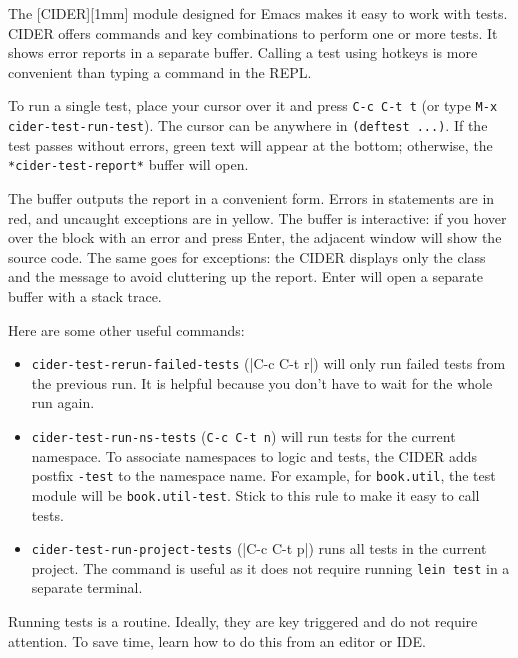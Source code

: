 
The [CIDER][1mm] module designed for Emacs makes it easy to work with tests. CIDER offers commands and key combinations to perform one or more tests. It shows error reports in a separate buffer. Calling a test using hotkeys is more convenient than typing a command in the REPL.

To run a single test, place your cursor over it and press \verb|C-c C-t t| (or type \verb|M-x cider-test-run-test|). The cursor can be anywhere in \verb|(deftest ...)|. If the test passes without errors, green text will appear at the bottom; otherwise, the \verb|*cider-test-report*| buffer will open.

The buffer outputs the report in a convenient form. Errors in statements are in red, and uncaught exceptions are in yellow. The buffer is interactive: if you hover over the block with an error and press Enter, the adjacent window will show the source code. The same goes for exceptions: the CIDER displays only the class and the message to avoid cluttering up the report. Enter will open a separate buffer with a stack trace.

Here are some other useful commands:

\begin{itemize}

\item
  \verb|cider-test-rerun-failed-tests| (\spverb|C-c C-t r|) will only run failed tests from the previous run. It is helpful because you don't have to wait for the whole run again.

\item
  \verb|cider-test-run-ns-tests| (\verb|C-c C-t n|) will run tests for the current namespace. To associate namespaces to logic and tests, the CIDER adds postfix \verb|-test| to the namespace name. For example, for \verb|book.util|, the test module will be \verb|book.util-test|. Stick to this rule to make it easy to call tests.

\item
  \verb|cider-test-run-project-tests| (\spverb|C-c C-t p|) runs all tests in the current project. The command is useful as it does not require running \verb|lein test| in a separate terminal.

\end{itemize}

Running tests is a routine. Ideally, they are key triggered and do not require attention. To save time, learn how to do this from an editor
or IDE.

